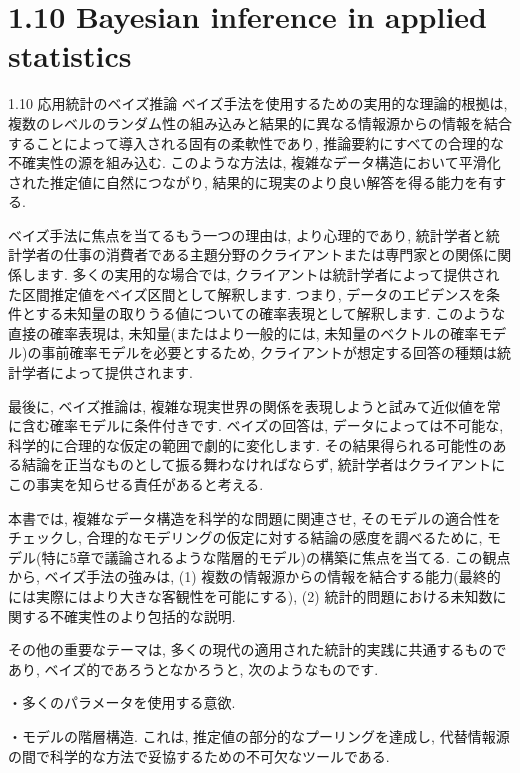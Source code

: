 \documentclass[10pt,dvipdfmx,a4]{beamer}
\begin{document}
\section{1.10 Bayesian inference in applied statistics}
\begin{frame}{1.10 応用統計のベイズ推論}
ベイズ手法を使用するための実用的な理論的根拠は, 複数のレベルのランダム性の組み込みと結果的に異なる情報源からの情報を結合することによって導入される固有の柔軟性であり, 推論要約にすべての合理的な不確実性の源を組み込む.
このような方法は, 複雑なデータ構造において平滑化された推定値に自然につながり, 結果的に現実のより良い解答を得る能力を有する.

ベイズ手法に焦点を当てるもう一つの理由は, より心理的であり, 統計学者と統計学者の仕事の消費者である主題分野のクライアントまたは専門家との関係に関係します.
多くの実用的な場合では, クライアントは統計学者によって提供された区間推定値をベイズ区間として解釈します.
つまり, データのエビデンスを条件とする未知量の取りうる値についての確率表現として解釈します.
このような直接の確率表現は, 未知量(またはより一般的には, 未知量のベクトルの確率モデル)の事前確率モデルを必要とするため, クライアントが想定する回答の種類は統計学者によって提供されます.
\end{frame}


\begin{frame}
最後に, ベイズ推論は, 複雑な現実世界の関係を表現しようと試みて近似値を常に含む確率モデルに条件付きです.
ベイズの回答は, データによっては不可能な, 科学的に合理的な仮定の範囲で劇的に変化します.
その結果得られる可能性のある結論を正当なものとして振る舞わなければならず, 統計学者はクライアントにこの事実を知らせる責任があると考える.

本書では, 複雑なデータ構造を科学的な問題に関連させ, そのモデルの適合性をチェックし, 合理的なモデリングの仮定に対する結論の感度を調べるために, モデル(特に5章で議論されるような階層的モデル)の構築に焦点を当てる.
この観点から, ベイズ手法の強みは, (1) 複数の情報源からの情報を結合する能力(最終的には実際にはより大きな客観性を可能にする), (2) 統計的問題における未知数に関する不確実性のより包括的な説明.

その他の重要なテーマは, 多くの現代の適用された統計的実践に共通するものであり, ベイズ的であろうとなかろうと, 次のようなものです.

・多くのパラメータを使用する意欲.

・モデルの階層構造.
これは, 推定値の部分的なプーリングを達成し, 代替情報源の間で科学的な方法で妥協するための不可欠なツールである.
\end{frame}
\end{document}
